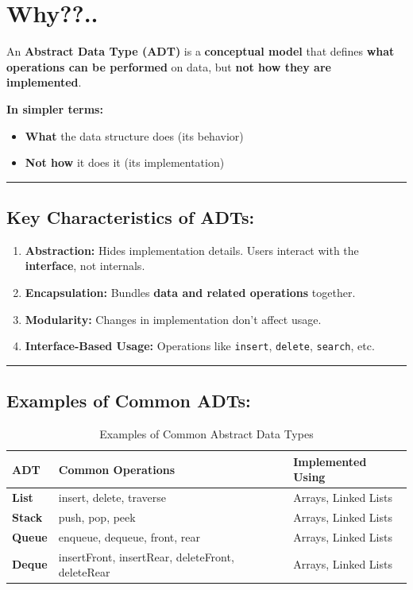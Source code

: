 \section*{\Large \textbf{Why??..}}
An \textbf{Abstract Data Type (ADT)} is a \textbf{conceptual model} that defines \textbf{what operations can be performed} on data, but \textbf{not how they are implemented}.

\textbf{In simpler terms:}
\begin{itemize}
  \item \textbf{What} the data structure does (its behavior)
  \item \textbf{Not how} it does it (its implementation)
\end{itemize}

\vspace{0.5cm}
\hrule
\vspace{0.5cm}

\subsection*{\normalsize \textbf{Key Characteristics of ADTs:}}
\begin{enumerate}[label=\textbf{\arabic*.}]
  \item \textbf{Abstraction:} Hides implementation details. Users interact with the \textbf{interface}, not internals.
  \item \textbf{Encapsulation:} Bundles \textbf{data and related operations} together.
  \item \textbf{Modularity:} Changes in implementation don’t affect usage.
  \item \textbf{Interface-Based Usage:} Operations like \texttt{insert}, \texttt{delete}, \texttt{search}, etc.
\end{enumerate}

\vspace{0.5cm}
\hrule
\vspace{0.5cm}

\subsection*{\textbf{Examples of Common ADTs:}}
\begin{table}[h!]
\centering
\begin{tabular}{@{}lll@{}}
\toprule
\textbf{ADT} & \textbf{Common Operations} & \textbf{Implemented Using} \\ \midrule
\textbf{List}  & insert, delete, traverse             & Arrays, Linked Lists \\
\textbf{Stack} & push, pop, peek                      & Arrays, Linked Lists \\
\textbf{Queue} & enqueue, dequeue, front, rear        & Arrays, Linked Lists \\
\textbf{Deque} & insertFront, insertRear, deleteFront, deleteRear & Arrays, Linked Lists \\
\bottomrule
\end{tabular}
\caption{Examples of Common Abstract Data Types}
\end{table}

